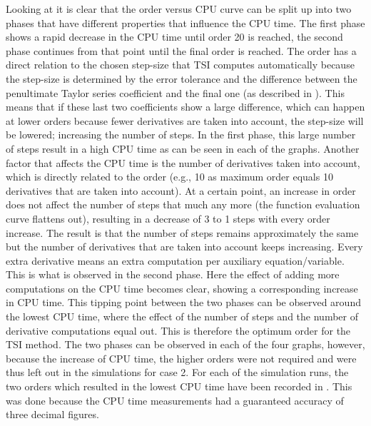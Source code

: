 \noindent
Looking at  it is clear that the order versus CPU curve can be split up into two phases that have different properties that influence the CPU time. The first phase shows a rapid decrease in the CPU time until order 20 is reached, the second phase continues from that point until the final order is reached. The order has a direct relation to the chosen step-size that \ac{TSI} computes automatically because the step-size is determined by the error tolerance and the difference between the penultimate Taylor series coefficient and the final one (as described in ). This means that if these last two coefficients show a large difference, which can happen at lower orders because fewer derivatives are taken into account, the step-size will be lowered; increasing the number of steps. In the first phase, this large number of steps result in a high CPU time as can be seen in each of the graphs. Another factor that affects the CPU time is the number of derivatives taken into account, which is directly related to the order (e.g., 10 as maximum order equals 10 derivatives that are taken into account). At a certain point, an increase in order does not affect the number of steps that much any more (the function evaluation curve flattens out), resulting in a decrease of 3 to 1 steps with every order increase. The result is that the number of steps remains approximately the same but the number of derivatives that are taken into account keeps increasing. Every extra derivative means an extra computation per auxiliary equation/variable. This is what is observed in the second phase. Here the effect of adding more computations on the CPU time becomes clear, showing a corresponding increase in CPU time. This tipping point between the two phases can be observed around the lowest CPU time, where the effect of the number of steps and the number of derivative computations equal out. This is therefore the optimum order for the \ac{TSI} method. The two phases can be observed in each of the four graphs, however, because the increase of CPU time, the higher orders were not required and were thus left out in the simulations for case 2. For each of the simulation runs, the two orders which resulted in the lowest CPU time have been recorded in . This was done because the CPU time measurements had a guaranteed accuracy of three decimal figures.

